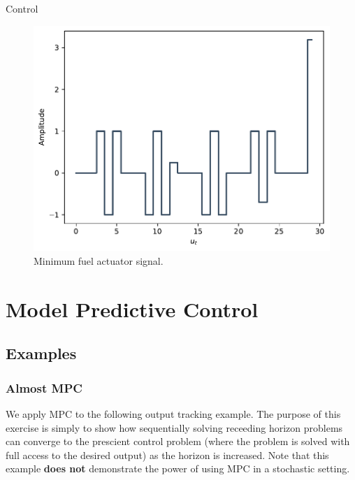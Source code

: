 \begin{chapter}{Control}
    \begin{figure}[h]
        \centering
        \includegraphics[width=\linewidth]{examples/cvx-ch4/4-16_min-fuel.pdf}
        \caption{Minimum fuel actuator signal.}
        \label{fig:4-16_min-fuel}
    \end{figure}
    
    \vspace*{.5cm}

    \section{Model Predictive Control}



    \subsection{Examples}


    \subsubsection*{Almost MPC}
    We apply MPC to the following output tracking example. The purpose of this exercise is simply to show
    how sequentially solving receeding horizon problems can converge to the prescient control problem (where
    the problem is solved with full access to the desired output) as the horizon is increased.
    Note that this example \textbf{does not} demonstrate the power of using MPC in a stochastic setting.


\end{chapter}
